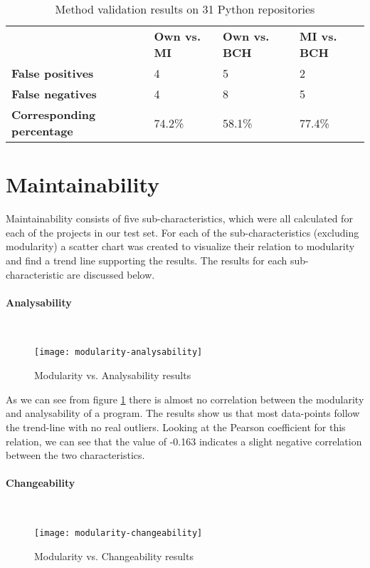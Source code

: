 \documentclass[twoside]{uva-inf-bachelor-thesis}
\newcommand{\myparagraph}[1]{\paragraph{#1}\mbox{}\\}
\begin{document}
\begin{table}[H]
\centering
\caption{Method validation results on 31 Python repositories}
\label{table:validation}
\begin{tabular}{llll}
\textbf{}                         & \textbf{Own vs. MI} & \textbf{Own vs. BCH} & \textbf{MI vs. BCH} \\ 
\textbf{False positives}          & 4                   & 5                    & 2                   \\
\textbf{False negatives}          & 4                   & 8                    & 5                   \\
\textbf{Corresponding percentage} & 74.2\%              & 58.1\%               & 77.4\%             
\end{tabular}
\end{table}

\section{Maintainability}
Maintainability consists of five sub-characteristics, which were all calculated for each of the projects in our test set. For each of the sub-characteristics (excluding modularity) a scatter chart was created to visualize their relation to modularity and find a trend line supporting the results. The results for each sub-characteristic are discussed below.

\myparagraph{Analysability}
\begin{figure}[H]
    \caption{Modularity vs. Analysability results}
    \label{figure:mod-analysis}
    \centering
        \texttt{[image: modularity-analysability]}
\end{figure}

As we can see from figure \ref{figure:mod-analysis} there is almost no correlation between the modularity and analysability of a program. The results show us that most data-points follow the trend-line with no real outliers. Looking at the Pearson coefficient for this relation, we can see that the value of -0.163 indicates a slight negative correlation between the two characteristics.

\myparagraph{Changeability}
\begin{figure}[H]
    \caption{Modularity vs. Changeability results}
    \label{figure:mod-change}
    \centering
        \texttt{[image: modularity-changeability]}
\end{figure}
\end{document}
